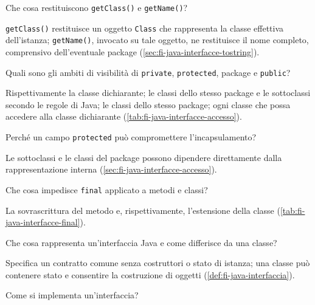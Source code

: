 \begin{exercise}
\label{ex:fi-esercizi-java-interfacce-class}
Che cosa restituiscono \texttt{getClass()} e \texttt{getName()}?
\end{exercise}

\texttt{getClass()} restituisce un oggetto \texttt{Class} che rappresenta la classe effettiva dell'istanza; \texttt{getName()}, invocato su tale oggetto, ne restituisce il nome completo, comprensivo dell'eventuale package (\cref{sec:fi-java-interfacce-tostring}).

\begin{exercise}
\label{ex:fi-esercizi-java-interfacce-accesso}
Quali sono gli ambiti di visibilità di \texttt{private}, \texttt{protected}, package e \texttt{public}?
\end{exercise}

Rispettivamente la classe dichiarante; le classi dello stesso package e le sottoclassi secondo le regole di Java; le classi dello stesso package; ogni classe che possa accedere alla classe dichiarante (\cref{tab:fi-java-interfacce-accesso}).

\begin{exercise}
\label{ex:fi-esercizi-java-interfacce-protected}
Perché un campo \texttt{protected} può compromettere l'incapsulamento?
\end{exercise}

Le sottoclassi e le classi del package possono dipendere direttamente dalla rappresentazione interna (\cref{sec:fi-java-interfacce-accesso}).

\begin{exercise}
\label{ex:fi-esercizi-java-interfacce-final}
Che cosa impedisce \texttt{final} applicato a metodi e classi?
\end{exercise}

La sovrascrittura del metodo e, rispettivamente, l'estensione della classe (\cref{tab:fi-java-interfacce-final}).

\clearpage

\begin{exercise}
\label{ex:fi-esercizi-java-interfacce-interfaccia}
Che cosa rappresenta un'interfaccia Java e come differisce da una classe?
\end{exercise}

Specifica un contratto comune senza costruttori o stato di istanza; una classe può contenere stato e consentire la costruzione di oggetti (\cref{def:fi-java-interfaccia}).

\begin{exercise}
\label{ex:fi-esercizi-java-interfacce-implements}
Come si implementa un'interfaccia?
\end{exercise}


